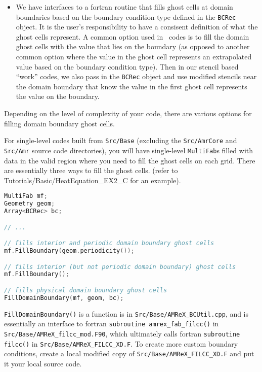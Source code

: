 \begin{itemize}
\item We have interfaces to a fortran routine that fills ghost cells at domain
boundaries based on the boundary condition type defined in the {\tt BCRec} object.
It is the user's responsibility to have a consisent definition of what the ghost cells
represent.  A common option used in \amrex\ codes is to fill the domain ghost cells
with the value that lies on the boundary (as opposed to another common option where
the value in the ghost cell represents an extrapolated value based on the boundary
condition type).  Then in our stencil based ``work'' codes, we also pass in the
{\tt BCRec} object and use modified stencils near the domain boundary that know the value
in the first ghost cell represents the value on the boundary.

\end{itemize}

Depending on the level of complexity of your code, there are various options
for filling domain boundary ghost cells.

For single-level codes built from {\tt Src/Base} (excluding the 
{\tt Src/AmrCore} and {\tt Src/Amr} source code directories), you will have 
single-level {\tt MultiFab}s filled with data in the valid region where you need 
to fill the ghost cells on each grid.  There are essentially three ways to fill the ghost 
cells. (refer to Tutorials/Basic/HeatEquation\_EX2\_C for an example).

\begin{lstlisting}[language=cpp]
MultiFab mf;
Geometry geom;
Array<BCRec> bc;

// ...

// fills interior and periodic domain boundary ghost cells
mf.FillBoundary(geom.periodicity());

// fills interior (but not periodic domain boundary) ghost cells
mf.FillBoundary();

// fills physical domain boundary ghost cells
FillDomainBoundary(mf, geom, bc);
\end{lstlisting}

{\tt FillDomainBoundary()} is a function is in {\tt Src/Base/AMReX\_BCUtil.cpp},
and is essentially an interface to fortran {\tt subroutine amrex\_fab\_filcc()}
in {\tt Src/Base/AMReX\_filcc\_mod.F90}, which ultimately calls fortran 
{\tt subroutine filcc()} in {\tt Src/Base/AMReX\_FILCC\_XD.F}.  To create more
custom boundary conditions, create a local modified copy of
{\tt Src/Base/AMReX\_FILCC\_XD.F} and put it your local source code.

